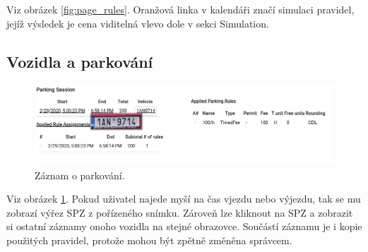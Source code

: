 \noindent
Viz obrázek \ref{fig:page_rules}.
Oranžová linka v kalendáři značí simulaci pravidel, jejíž výsledek je cena viditelná vlevo
dole v sekci Simulation.

\subsection*{Vozidla a parkování}

\begin{figure}[!htb] \centering
  \includegraphics[width=145mm]{../img/page_vehicles1.png}
  \caption{Záznam o parkování.}
  \label{fig:page_session}
\end{figure}

\noindent
Viz obrázek \ref{fig:page_session}.
Pokud uživatel najede myší na čas vjezdu nebo výjezdu, tak se mu zobrazí výřez SPZ z pořízeného snímku.
Zároveň lze kliknout na SPZ a zobrazit si ostatní záznamy onoho vozidla na stejné obrazovce.
Součástí záznamu je i kopie použitých pravidel, protože mohou být zpětně změněna správcem.
